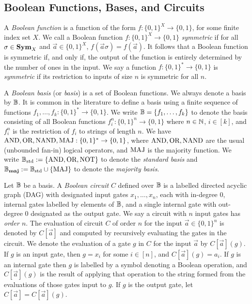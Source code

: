 \documentclass[../paper.tex]{subfiles}
\begin{document}
\subsection{Boolean Functions, Bases, and Circuits}
A \emph{Boolean function} is a function of the form $f: \{0,1\}^X \rightarrow
\{0,1\}$, for some finite index set $X$. We call a Boolean function $f:
\{0,1\}^X \rightarrow \{0,1\}$ \emph{symmetric} if for all $\sigma \in \text{\textbf{Sym}}_X$
and $\vec{a} \in \{0,1\}^X$, $f (\vec{a} \sigma) = f(\vec{a})$. It follows that
a Boolean function is symmetric if, and only if, the output of the function is
entirely determined by the number of ones in the input. We say a function $f :
\{0,1\}^{*} \rightarrow \{0,1\}$ is \emph{symmetric} if its restriction to
inputs of size $n$ is symmetric for all $n$.

A \emph{Boolean basis} (or \emph{basis}) is a set of Boolean functions. We
always denote a basis by $\mathbb{B}$. It is common in the literature to define a basis
using a finite sequence of functions $f_1, \ldots , f_k:\{0,1\}^* \rightarrow
\{0,1\}$. We write $\mathbb{B} = \{f_1, \ldots, f_k\}$ to denote the basis consisting
of all Boolean functions $f^n_i : \{0,1\}^n \rightarrow \{0,1\}$ where $n \in
\mathbb{N}$, $i \in [k]$, and $f^n_i$ is the restriction of $f_i$ to strings of
length $n$. We have $\text{\upshape AND}, \text{\upshape OR}, \text{\upshape NAND}, \text{\upshape MAJ} : \{0,1\}^* \rightarrow \{0,1\}$,
where $\text{\upshape AND}, \text{\upshape OR}, \text{\upshape NAND}$ are the usual (unbounded fan-in) logical operators, and
$\text{\upshape MAJ}$ is the majority function. We write $\mathbb{B}_{\text{std}} := \{\text{\upshape AND}, \text{\upshape OR}, \text{\upshape NOT}\}$ to denote
the \emph{standard basis} and $\mathbb{B}_{\text{\textbf{maj}}} := \mathbb{B}_{\text{std}} \cup \{\text{\upshape MAJ}\}$ to denote the
\emph{majority basis}.

Let $\mathbb{B}$ be a basis. A \emph{Boolean circuit} $C$ defined over $\mathbb{B}$ is a
labelled directed acyclic graph (DAG) with designated input gates $x_1, \ldots,
x_n$, each with in-degree $0$, internal gates labelled by elements of $\mathbb{B}$, and
a single internal gate with out-degree $0$ designated as the output gate. We say
a circuit with $n$ input gates has \emph{order $n$}. The evaluation of circuit
$C$ of order $n$ for the input $\vec{a} \in \{0,1\}^n$ is denoted by
$C[\vec{a}]$ and computed by recursively evaluating the gates in the circuit. We
denote the evaluation of a gate $g$ in $C$ for the input $\vec{a}$ by
$C[\vec{a}](g)$. If $g$ is an input gate, then $g = x_i$ for some $i \in [n]$,
and $C[\vec{a}](g) = a_i$. If $g$ is an internal gate then $g$ is labelled by a
symbol denoting a Boolean operation, and $C[\vec{a}](g)$ is the result of
applying that operation to the string formed from the evaluations of those gates
input to $g$. If $g$ is the output gate, let $C[\vec{a}] = C[\vec{a}](g)$.
\end{document}
